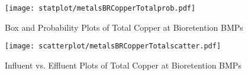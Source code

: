         \begin{figure}[hb]   %
            \centering
            \texttt{[image: statplot/metalsBRCopperTotalprob.pdf]}
            \caption{Box and Probability Plots of Total Copper at Bioretention BMPs}
        \end{figure}         %
        
        
        \begin{figure}[hb]   %
            \centering
            \texttt{[image: scatterplot/metalsBRCopperTotalscatter.pdf]}
            \caption{Influent vs. Effluent Plots of Total Copper at Bioretention BMPs}
        \end{figure}         %
        \clearpage
        